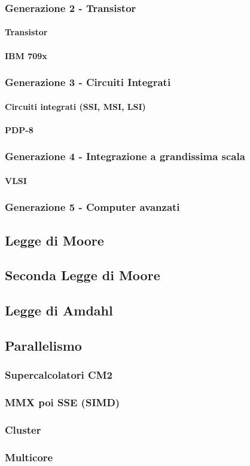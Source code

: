 \documentclass{article}
\begin{document}
	\subsubsection{Generazione 2 - Transistor}
	\paragraph{Transistor}
	\paragraph{IBM 709x}
	\subsubsection{Generazione 3 - Circuiti Integrati}
	\paragraph{Circuiti integrati (SSI, MSI, LSI)}
	\paragraph{PDP-8}
	\subsubsection{Generazione 4 - Integrazione a grandissima scala}
	\paragraph{VLSI}
	\subsubsection{Generazione 5 - Computer avanzati}
	\subsection{Legge di Moore}
	\subsection{Seconda Legge di Moore}
	\subsection{Legge di Amdahl}
	\subsection{Parallelismo}
	\subsubsection{Supercalcolatori CM2}
	\subsubsection{MMX poi SSE (SIMD)}
	\subsubsection{Cluster}
	\subsubsection{Multicore}
	
\end{document}
